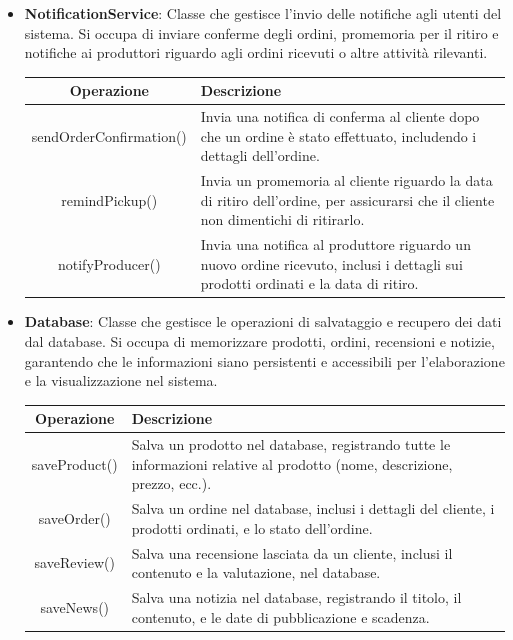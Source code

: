\begin{itemize}
\item \textbf{NotificationService}:
Classe che gestisce l'invio delle notifiche agli utenti del sistema. Si occupa di inviare conferme degli ordini, promemoria per il ritiro e notifiche ai produttori riguardo agli ordini ricevuti o altre attività rilevanti.
\begin{table}[!htbp]
    \centering
    \begin{tabularx}{\textwidth}{| c | X |}
    \hline
         \textbf{Operazione} & \textbf{Descrizione} \\
         \hline
         sendOrderConfirmation() & Invia una notifica di conferma al cliente dopo che un ordine è stato effettuato, includendo i dettagli dell'ordine. \\
         \hline
         remindPickup() & Invia un promemoria al cliente riguardo la data di ritiro dell'ordine, per assicurarsi che il cliente non dimentichi di ritirarlo. \\
         \hline
         notifyProducer() & Invia una notifica al produttore riguardo un nuovo ordine ricevuto, inclusi i dettagli sui prodotti ordinati e la data di ritiro. \\
         \hline
    \end{tabularx}
\end{table}

\item \textbf{Database}:
Classe che gestisce le operazioni di salvataggio e recupero dei dati dal database. Si occupa di memorizzare prodotti, ordini, recensioni e notizie, garantendo che le informazioni siano persistenti e accessibili per l'elaborazione e la visualizzazione nel sistema.
\begin{table}[!htbp]
    \centering
    \begin{tabularx}{\textwidth}{| c | X |}
    \hline
         \textbf{Operazione} & \textbf{Descrizione} \\
         \hline
         saveProduct() & Salva un prodotto nel database, registrando tutte le informazioni relative al prodotto (nome, descrizione, prezzo, ecc.). \\
         \hline
         saveOrder() & Salva un ordine nel database, inclusi i dettagli del cliente, i prodotti ordinati, e lo stato dell'ordine. \\
         \hline
         saveReview() & Salva una recensione lasciata da un cliente, inclusi il contenuto e la valutazione, nel database. \\
         \hline
         saveNews() & Salva una notizia nel database, registrando il titolo, il contenuto, e le date di pubblicazione e scadenza. \\
         \hline
    \end{tabularx}
\end{table}
\end{itemize}